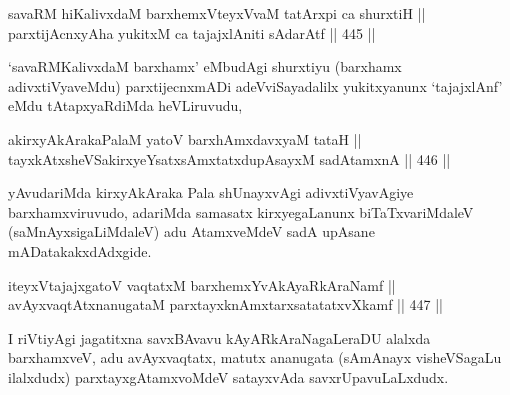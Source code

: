 \begin{shl}
savaRM hi\footnotemark[1] KalivxdaM barxhemxVteyxVvaM tatArxpi ca shurxtiH || \\
parxtijAcnxyA\s \s ha yukitxM ca \footnotemark[2]tajajxlAniti sAdarAtf \hfill || 445 ||  
\end{shl}

\begin{artha}
`savaRMKalivxdaM barxhamx' eMbudAgi shurxtiyu (barxhamx adivxtiVyaveMdu) parxtijecnxmADi adeVviSayadalilx yukitxyanunx `tajajxlAnf' eMdu tAtapxyaRdiMda heVLiruvudu,
\end{artha}


\begin{shl}
akirxyAkArakaPalaM yatoV barxhAmxdavxyaM tataH || \\
tayxkAtxsheVSakirxyeYsatxsAmxtatxdupAsayxM sadA\s \s tamxnA \hfill || 446 ||  
\end{shl}

\begin{artha}
yAvudariMda kirxyAkAraka Pala shUnayxvAgi adivxtiVyavAgiye barxhamxviruvudo, adariMda samasatx kirxyegaLanunx biTaTxvariMdaleV (saMnAyxsigaLiMdaleV) adu AtamxveMdeV sadA upAsane mADatakakxdAdxgide.
\end{artha}

\begin{shl}
iteyxVtajajxgatoV vaqtatxM barxhemxYvAkAyaRkAraNamf || \\
avAyxvaqtAtxnanugataM parxtayxknAmxtarxsatatatxvXkamf \hfill || 447 ||  
\end{shl}

\begin{artha}
I riVtiyAgi jagatitxna savxBAvavu kAyARkAraNagaLeraDU alalxda
barxhamxveV,  adu avAyxvaqtatx, matutx ananugata (sAmAnayx
visheVSagaLu ilalxdudx) parxtayxgAtamxvoMdeV satayxvAda
savxrUpavuLaLxdudx.
\end{artha}

